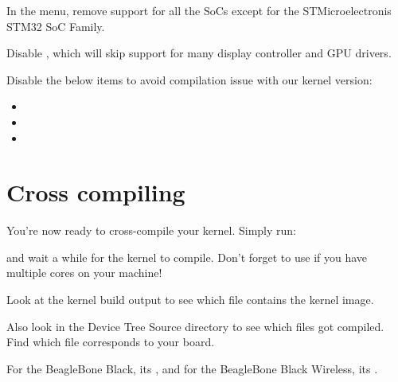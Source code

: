 \begin{itemize}
{\item In the  menu, remove support for all the SoCs except
for the STMicroelectronis STM32 SoC Family.
\item Disable , which will skip support for many display
controller and GPU drivers.
\item Disable the below items to avoid compilation issue with our kernel version:
\begin{itemize}
\item {}
\item {}
\item {}
\end{itemize}
}{}
\end{itemize}



\section{Cross compiling}

You're now ready to cross-compile your kernel. Simply run:


and wait a while for the kernel to compile. Don't forget to use
 if you have multiple cores on your machine!

Look at the kernel build output to see which file contains
the kernel image.

Also look in the Device Tree Source directory to see which 
files got compiled. Find which  file corresponds to your board.

{For the BeagleBone Black, its ,
and for the BeagleBone Black Wireless, its
.}
{}

